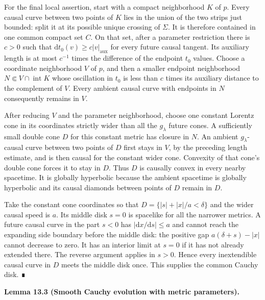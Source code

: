 \documentclass[
  english,
  11pt,
  reqno]{amsart}
\makeatletter
\newcommand{\pandocstatementheading}[1]{%
  \par\addpenalty{\@beginparpenalty}%
  \addvspace{.5\baselineskip plus .2\baselineskip minus .2\baselineskip}%
  {\normalfont\bfseries #1\par}%
  \nobreak\@afterindenttrue\@afterheading
}
\newcommand{\paperblockheading}[2][.45\baselineskip]{%
  \par\Needspace{6\baselineskip}%
  \addvspace{\baselineskip}%
  \noindent{\normalfont\bfseries #2}\par\nobreak
  \vskip#1\relax\nobreak
}
\makeatother
\begin{document}
For the final local assertion, start with a compact neighborhood \(K\)
of \(p\). Every causal curve between two points of \(K\) lies in the
union of the two strips just bounded: split it at its possible unique
crossing of \(\Sigma\). It is therefore contained in one common compact
set \(C\). On that set, after a parameter restriction there is \(c>0\)
such that \(\mathrm dt_0(v)\ge c|v|_{\mathrm{aux}}\) for every future
causal tangent. Its auxiliary length is at most \(c^{-1}\) times the
difference of the endpoint \(t_0\) values. Choose a coordinate
neighborhood \(V\) of \(p\), and then a smaller endpoint neighborhood
\(N\Subset V\cap\operatorname{int}K\) whose oscillation in \(t_0\) is
less than \(c\) times its auxiliary distance to the complement of \(V\).
Every ambient causal curve with endpoints in \(N\) consequently remains
in \(V\).

After reducing \(V\) and the parameter neighborhood, choose one constant
Lorentz cone in its coordinates strictly wider than all the
\(g_\lambda\) future cones. A sufficiently small double cone \(D\) for
this constant metric has closure in \(N\). An ambient
\(g_\lambda\)-causal curve between two points of \(D\) first stays in
\(V\), by the preceding length estimate, and is then causal for the
constant wider cone. Convexity of that cone's double cone forces it to
stay in \(D\). Thus \(D\) is causally convex in every nearby spacetime.
It is globally hyperbolic because the ambient spacetime is globally
hyperbolic and its causal diamonds between points of \(D\) remain in
\(D\).

Take the constant cone coordinates so that \(D=\{|s|+|x|/a<\delta\}\)
and the wider causal speed is \(a\). Its middle disk \(s=0\) is
spacelike for all the narrower metrics. A future causal curve in the
part \(s<0\) has \(|\mathrm dx/\mathrm ds|\le a\) and cannot reach the
expanding side boundary before the middle disk: the positive gap
\(a(\delta+s)-|x|\) cannot decrease to zero. It has an interior limit at
\(s=0\) if it has not already extended there. The reverse argument
applies in \(s>0\). Hence every inextendible causal curve in \(D\) meets
the middle disk once. This supplies the common Cauchy disk. ∎

\paperblockheading[0pt]{Evolution with parameters.}

\pandocstatementheading{\protect{}\label{lem:family-smooth-cauchy-evolution}Lemma 13.3 (Smooth Cauchy evolution with metric parameters).}
\end{document}
